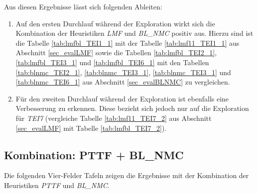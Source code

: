 \begin{multicols}{2}
\columnbreak
{}
\end{multicols}

\begin{multicols}{2}
\columnbreak
{}
\end{multicols}

\begin{multicols}{2}
\columnbreak
{}
\end{multicols}
\noindent
Aus diesen Ergebnisse lässt sich folgenden Ableiten:
\begin{enumerate}
\item Auf den ersten Durchlauf während der Exploration wirkt sich die Kombination der Heuristiken \emph{LMF} und \emph{BL\_NMC} positiv aus. Hierzu sind ist die Tabelle \ref{tab:lmfbl_TEI1_1} mit der Tabelle \ref{tab:lmf11_TEI1_1} aus Abschnitt \ref{sec_evalLMF} sowie die Tabellen \ref{tab:lmfbl_TEI2_1}, \ref{tab:lmfbl_TEI3_1} und \ref{tab:lmfbl_TEI6_1} mit den Tabellen \ref{tab:blnmc_TEI2_1}, \ref{tab:blnmc_TEI3_1}, \ref{tab:blnmc_TEI3_1} und \ref{tab:blnmc_TEI6_1} aus Abschnitt \ref{sec_evalBLNMC} zu vergleichen.
\item Für den zweiten Durchlauf während der Exploration ist ebenfalls eine Verbesserung zu erkennen. Diese bezieht sich jedoch nur auf die Exploration für \emph{TEI7} (vergleiche Tabelle \ref{tab:lmf11_TEI7_2} aus Abschnitt \ref{sec_evalLMF} mit Tabelle \ref{tab:lmfbl_TEI7_2}).
\end{enumerate}

\subsection{Kombination: PTTF + BL\_NMC}\label{sec_evalPTTFBLNMC}
Die folgenden Vier-Felder Tafeln zeigen die Ergebnisse mit der Kombination der Heuristiken \emph{PTTF} und \emph{BL\_NMC}.
\begin{multicols}{3}
\columnbreak
{}\columnbreak
{}
\end{multicols}


